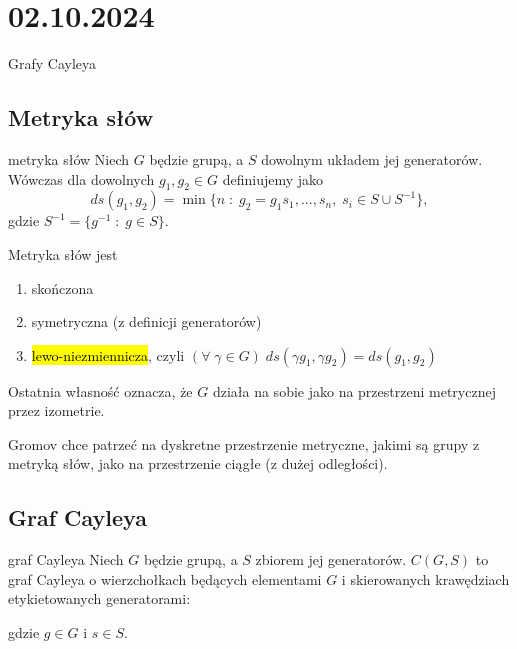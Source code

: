 \section{02.10.2024}{Grafy Cayleya}

\subsection{Metryka słów}

\begin{definition}{metryka słów}{}
  Niech $G$ będzie grupą, a $S$ dowolnym układem jej generatorów. Wówczas dla dowolnych $g_1,g_2\in G$  definiujemy jako
$$ds(g_1, g_2)=\min\{n\;:\;g_2=g_1s_1,...,s_n,\;s_i\in S\cup S^{-1}\},$$
gdzie $S^{-1}=\{g^{-1}\;:\;g\in S\}$.
\end{definition}

Metryka słów jest 
\begin{enumerate}
  \item skończona
  \item symetryczna (z definicji generatorów)
  \item \hl{lewo-niezmiennicza}, czyli $(\forall\;\gamma\in G)\;ds(\gamma g_1,\gamma g_2)=ds(g_1, g_2)$
\end{enumerate}
Ostatnia własność oznacza, że $G$ działa na sobie jako na przestrzeni metrycznej przez izometrie.

Gromov chce patrzeć na dyskretne przestrzenie metryczne, jakimi są grupy z metryką słów, jako na przestrzenie ciągłe (z dużej odległości).

\subsection{Graf Cayleya}

\begin{definition}{graf Cayleya}{}
Niech $G$ będzie grupą, a $S$ zbiorem jej generatorów. $C(G, S)$ to graf Cayleya o wierzchołkach będących elementami $G$ i skierowanych krawędziach etykietowanych generatorami:
\begin{center}
\end{center}
gdzie $g\in G$ i $s\in S$.
\end{definition}

